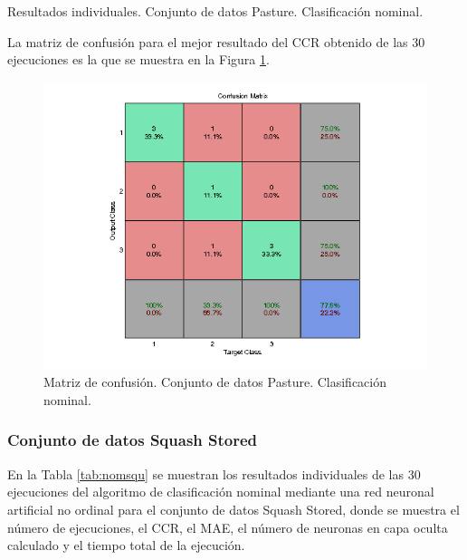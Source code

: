 			\begin{table}[!htbp]
				\centering
				\caption{Resultados individuales. Conjunto de datos Pasture. Clasificación nominal.}
				\label{tab:nompas}
			\end{table}
			
			La matriz de confusión para el mejor resultado del CCR obtenido de las 30 ejecuciones es la que se muestra en la Figura \ref{fig:nompas}.
			
			\begin{figure}[htbp]
				\centering
				\includegraphics[scale=0.8]{../src/results/nominal/pasture_mc7.png}
				\caption{Matriz de confusión. Conjunto de datos Pasture. Clasificación nominal.}
				\label{fig:nompas}
			\end{figure}

			\subsubsection{Conjunto de datos Squash Stored}
			
			En la Tabla \ref{tab:nomsqu} se muestran los resultados individuales de las 30 ejecuciones del algoritmo de clasificación nominal mediante una red neuronal artificial no ordinal para el conjunto de datos Squash Stored, donde se muestra el número de ejecuciones, el CCR, el MAE, el número de neuronas en capa oculta calculado y el tiempo total de la ejecución.\\
			
